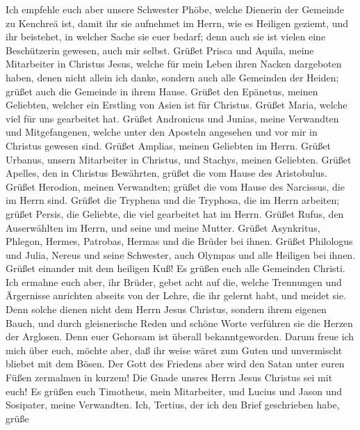  Ich empfehle euch aber unsere Schwester Phöbe, welche
Dienerin der Gemeinde zu Kenchreä ist,  damit ihr sie
aufnehmet im Herrn, wie es Heiligen geziemt, und ihr beistehet, in
welcher Sache sie euer bedarf; denn auch sie ist vielen eine
Beschützerin gewesen, auch mir selbst.  Grüßet Prisca und
Aquila, meine Mitarbeiter in Christus Jesus,  welche für
mein Leben ihren Nacken dargeboten haben, denen nicht allein ich danke,
sondern auch alle Gemeinden der Heiden; grüßet auch die Gemeinde in
ihrem Hause.  Grüßet den Epänetus, meinen Geliebten,
welcher ein Erstling von Asien ist für Christus.  Grüßet
Maria, welche viel für uns gearbeitet hat.  Grüßet
Andronicus und Junias, meine Verwandten und Mitgefangenen, welche unter
den Aposteln angesehen und vor mir in Christus gewesen sind.
 Grüßet Amplias, meinen Geliebten im Herrn. 
Grüßet Urbanus, unsern Mitarbeiter in Christus, und Stachys, meinen
Geliebten.  Grüßet Apelles, den in Christus Bewährten,
grüßet die vom Hause des Aristobulus.  Grüßet Herodion,
meinen Verwandten; grüßet die vom Hause des Narcissus, die im Herrn
sind.  Grüßet die Tryphena und die Tryphosa, die im Herrn
arbeiten; grüßet Persis, die Geliebte, die viel gearbeitet hat im Herrn.
 Grüßet Rufus, den Auserwählten im Herrn, und seine und
meine Mutter.  Grüßet Asynkritus, Phlegon, Hermes,
Patrobas, Hermas und die Brüder bei ihnen.  Grüßet
Philologus und Julia, Nereus und seine Schwester, auch Olympas und alle
Heiligen bei ihnen.  Grüßet einander mit dem heiligen
Kuß! Es grüßen euch alle Gemeinden Christi.  Ich ermahne
euch aber, ihr Brüder, gebet acht auf die, welche Trennungen und
Ärgernisse anrichten abseits von der Lehre, die ihr gelernt habt, und
meidet sie.  Denn solche dienen nicht dem Herrn Jesus
Christus, sondern ihrem eigenen Bauch, und durch gleisnerische Reden und
schöne Worte verführen sie die Herzen der Arglosen.  Denn
euer Gehorsam ist überall bekanntgeworden. Darum freue ich mich über
euch, möchte aber, daß ihr weise wäret zum Guten und unvermischt bliebet
mit dem Bösen.  Der Gott des Friedens aber wird den Satan
unter euren Füßen zermalmen in kurzem! Die Gnade unsres Herrn Jesus
Christus sei mit euch!  Es grüßen euch Timotheus, mein
Mitarbeiter, und Lucius und Jason und Sosipater, meine Verwandten.
 Ich, Tertius, der ich den Brief geschrieben habe, grüße
